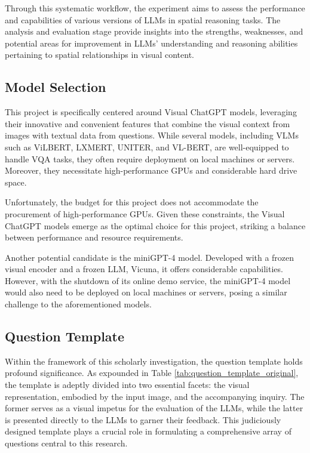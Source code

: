 \documentclass[twocolumn,11pt]{report}
\begin{document}
Through this systematic workflow, the experiment aims to assess the performance and capabilities of various versions of LLMs in spatial reasoning tasks. The analysis and evaluation stage provide insights into the strengths, weaknesses, and potential areas for improvement in LLMs' understanding and reasoning abilities pertaining to spatial relationships in visual content.

\subsection{Model Selection}
This project is specifically centered around Visual ChatGPT models, leveraging their innovative and convenient features that combine the visual context from images with textual data from questions\cite{wu2023visual}. While several models, including VLMs such as ViLBERT, LXMERT, UNITER, and VL-BERT, are well-equipped to handle VQA tasks, they often require deployment on local machines or servers. Moreover, they necessitate high-performance GPUs and considerable hard drive space.

Unfortunately, the budget for this project does not accommodate the procurement of high-performance GPUs. Given these constraints, the Visual ChatGPT models emerge as the optimal choice for this project, striking a balance between performance and resource requirements.

Another potential candidate is the miniGPT-4 model\cite{zhu2023minigpt4}. Developed with a frozen visual encoder and a frozen LLM, Vicuna, it offers considerable capabilities. However, with the shutdown of its online demo service, the miniGPT-4 model would also need to be deployed on local machines or servers, posing a similar challenge to the aforementioned models.


\subsection{Question Template}
Within the framework of this scholarly investigation, the question template holds profound significance. As expounded in Table \ref{tab:question_template_original}, the template is adeptly divided into two essential facets: the visual representation, embodied by the input image, and the accompanying inquiry. The former serves as a visual impetus for the evaluation of the LLMs, while the latter is presented directly to the LLMs to garner their feedback. This judiciously designed template plays a crucial role in formulating a comprehensive array of questions central to this research.
\end{document}
